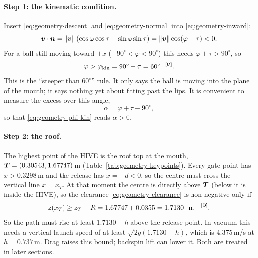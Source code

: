 \paragraph{Step 1: the kinematic condition.} Insert \eqref{eq:geometry-descent} and
\eqref{eq:geometry-normal} into \eqref{eq:geometry-inward}:
\begin{equation}
  \bm{v}\cdot\bm{n} = \lVert\bm{v}\rVert\,(\cos\varphi\cos\tau - \sin\varphi\sin\tau)
  = \lVert\bm{v}\rVert\cos(\varphi + \tau) < 0 .
  \label{eq:geometry-vdotn}
\end{equation}
For a ball still moving toward $+x$ ($-90^\circ < \varphi < 90^\circ$) this needs
$\varphi + \tau > 90^\circ$, so
\begin{equation}
  \varphi > \varphi_{\mathrm{kin}} = 90^\circ - \tau = 60^\circ\text{\derived}.
  \label{eq:geometry-phi-kin}
\end{equation}
This is the ``steeper than $60^\circ$'' rule. It only says the ball is moving into the plane of the
mouth; it says nothing yet about fitting past the lips. It is convenient to measure the excess
over this angle,
\begin{equation}
  \alpha = \varphi + \tau - 90^\circ ,
  \label{eq:geometry-alpha}
\end{equation}
so that \eqref{eq:geometry-phi-kin} reads $\alpha > 0$.

\paragraph{Step 2: the roof.} The highest point of the HIVE is the roof top at the mouth,
$\bm{T} = (0.30543, 1.67747)$\,\unit{m}\derived{} (Table~\ref{tab:geometry-keypoints}). Every gate point
has $x > 0.3298$\,\unit{m}\derived{} and the release has $x = -d < 0$, so the centre must cross the
vertical line $x = x_T$. At that moment the centre is directly above $\bm{T}$ (below it is inside
the HIVE), so the clearance \eqref{eq:geometry-clearance} is non-negative only if
\begin{equation}
  z(x_T) \ge z_T + R = 1.67747 + 0.0355 = 1.7130\ \text{\unit{m}}\text{\derived}.
  \label{eq:geometry-roof}
\end{equation}
So the path must rise at least $1.7130 - h$ above the release point. In vacuum this needs a vertical
launch speed of at least $\sqrt{2g(1.7130 - h)}$, which is $4.375$\,\unit{m/s}\derived{} at
$h = 0.737$\,\unit{m}\assumed. Drag raises this bound; backspin lift can lower it. Both are treated in
later sections.

